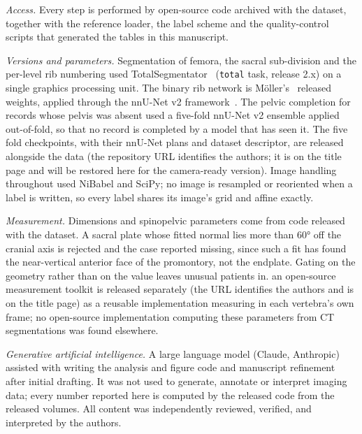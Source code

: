 \documentclass[aapm,mph,amsmath,amssymb,reprint]{revtex4-2}
\newif\ifreview \reviewtrue
\newcommand{\toolkit}{\ifreview an open-source measurement toolkit\else OpenSpineToolkit, a unit-tested open-source package\fi}
\begin{document}
\emph{Access.} Every step is performed by open-source code archived with the dataset,
together with the reference loader, the label scheme and the quality-control scripts that
generated the tables in this manuscript.

\emph{Versions and parameters.} Segmentation of femora, the sacral sub-division and the
per-level rib numbering used TotalSegmentator~\cite{totalsegmentator} (\texttt{total} task,
release 2.x) on a single graphics processing unit. The binary rib network is
M\"oller's~\cite{moller2026} released weights, applied through the nnU-Net v2
framework~\cite{nnunet}. The pelvic completion for records whose pelvis was absent used a
five-fold nnU-Net v2 ensemble applied out-of-fold, so that no record is completed by a
model that has seen it. The five fold
checkpoints, with their nnU-Net plans and dataset descriptor, are released alongside the
data (\ifreview the repository URL identifies the authors; it is on the title page and will be
restored here for the camera-ready version\else\url{https://huggingface.co/OpenSpineConsortium/spinopelvic-seg-checkpoints}, trained with \url{https://github.com/Gregory-Schwing-MD-PhD/spinesurg-ct-nnunet} at commit 50b209f\fi). Image handling
throughout used NiBabel and SciPy; no image is resampled or reoriented when a label is
written, so every label shares its image's grid and affine exactly.

\emph{Measurement.} Dimensions and spinopelvic parameters come from code released with the
dataset. A sacral plate whose fitted normal lies more than 60\si{\degree} off the cranial
axis is rejected and the case reported missing, since such a fit has found the near-vertical
anterior face of the promontory, not the endplate. Gating on the geometry rather than on
the value leaves unusual patients in. \toolkit{} is released separately
(\ifreview the URL identifies the authors and is on the title page\else\url{https://github.com/OpenSpineConsortium/OpenSpineToolkit}\fi)
as a reusable implementation measuring in each vertebra's own frame; no open-source
implementation computing these parameters from CT segmentations was found elsewhere.

\emph{Generative artificial intelligence.} A large language model (Claude, Anthropic)
assisted with writing the analysis and
figure code and manuscript refinement after initial drafting. It was not used to generate, annotate or interpret
imaging data; every number reported here is computed by the released code from the
released volumes. All content was independently reviewed, verified, and interpreted by the authors.
\end{document}
